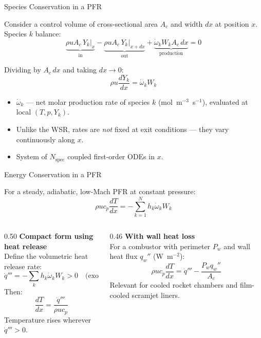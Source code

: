 \documentclass[12pt,aspectratio=169]{beamer}
\newcommand{\ddx}[1]{\frac{d#1}{dx}}
\newcommand{\Ac}{A_c}
\newcommand{\wdot}{\dot{\omega}}
\begin{document}
\begin{frame}{Species Conservation in a PFR}

  Consider a control volume of cross-sectional area $\Ac$ and width
  $dx$ at position $x$. Species $k$ balance:
  \[
    \underbrace{\rho u \Ac \, Y_k\big|_x}_{\text{in}}
    - \underbrace{\rho u \Ac \, Y_k\big|_{x+dx}}_{\text{out}}
    + \underbrace{\wdot_k W_k \Ac\,dx}_{\text{production}}
    = 0
  \]

  Dividing by $\Ac\,dx$ and taking $dx\to 0$:
  \[
    \boxed{
      \rho u \ddx{Y_k} = \wdot_k W_k
    }
  \]

  \begin{itemize}
    \item $\wdot_k$ --- net molar production rate of species $k$
          (mol~m$^{-3}$~s$^{-1}$), evaluated at \alert{local} $(T, p, Y_k)$.
    \item Unlike the WSR, rates are \emph{not} fixed at exit conditions ---
          they vary continuously along $x$.
    \item System of $N_{\text{spec}}$ coupled first-order ODEs in $x$.
  \end{itemize}
\end{frame}

\begin{frame}{Energy Conservation in a PFR}

  For a steady, adiabatic, low-Mach PFR at constant pressure:
  \[
    \boxed{
      \rho u c_p \ddx{T} = -\sum_{k=1}^{N} h_k \wdot_k W_k
    }
  \]

  \begin{columns}[t]
    \begin{column}{0.50\textwidth}
      \textbf{Compact form using heat release}\\[4pt]
      Define the volumetric heat release rate:
      \[
        \dot{q}''' = -\sum_k h_k \wdot_k W_k > 0
        \quad\text{(exothermic)}
      \]
      Then:
      \[
        \ddx{T} = \frac{\dot{q}'''}{\rho u c_p}
      \]
      Temperature rises wherever $\dot{q}''' > 0$.
    \end{column}
    \begin{column}{0.46\textwidth}
      \textbf{With wall heat loss}\\[4pt]
      For a combustor with perimeter $P_w$ and
      wall heat flux $q_w''$ (W~m$^{-2}$):
      \[
        \rho u c_p \ddx{T}
        = \dot{q}''' - \frac{P_w q_w''}{\Ac}
      \]
      \small Relevant for cooled rocket chambers
      and film-cooled scramjet liners.
    \end{column}
  \end{columns}
\end{frame}
\end{document}
